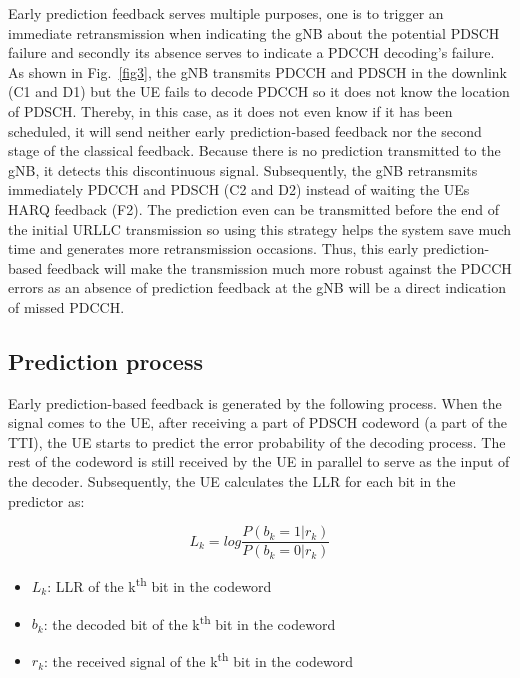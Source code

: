 \documentclass[conference]{IEEEtran}
\begin{document}
Early prediction feedback serves multiple purposes, one is to trigger an immediate retransmission when indicating the gNB about the potential PDSCH failure and secondly its absence serves to indicate a PDCCH decoding's failure. As shown in Fig.~\ref{fig3}, the gNB transmits PDCCH and PDSCH in the downlink (C1 and D1) but the UE fails to decode PDCCH so it does not know the location of PDSCH. Thereby, in this case, as it does not even know if it has been scheduled, it will send neither early prediction-based feedback nor the second stage of the classical feedback. Because there is no prediction transmitted to the gNB, it detects this discontinuous signal. Subsequently, the gNB retransmits immediately PDCCH and PDSCH (C2 and D2) instead of waiting the UE\textquotesingle s HARQ feedback (F2). The prediction even can be transmitted before the end of the initial URLLC transmission so using this strategy helps the system save much time and generates more retransmission occasions. Thus, this early prediction-based feedback will make the transmission much more robust against the PDCCH errors as an absence of prediction feedback at the gNB will be a direct indication of missed PDCCH. 

\subsection{Prediction process}\label{BB}
Early prediction-based feedback is generated by the following process. When the signal comes to the UE, after receiving a part of PDSCH codeword (a part of the TTI), the UE starts to predict the error probability of the decoding process. The rest of the codeword is still received by the UE in parallel to serve as the input of the decoder. Subsequently, the UE calculates the LLR for each bit in the predictor as: 

\begin{equation}
    L_{k} = log \frac{P(b_{k}=1|r_{k})}{P(b_{k}=0|r_{k})}
\end{equation}

\begin{itemize}
    \item $L_{k}$: LLR of the k\textsuperscript{th} bit in the codeword 
    \item $b_{k}$: the decoded bit of the k\textsuperscript{th} bit in the codeword
    \item $r_{k}$: the received signal of the k\textsuperscript{th} bit in the codeword
\end{itemize}
\end{document}

